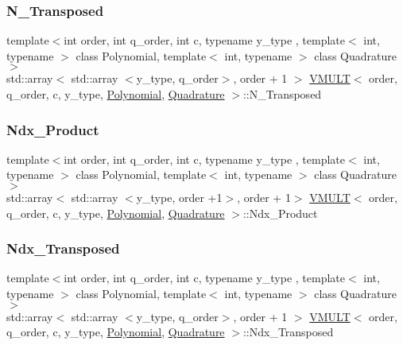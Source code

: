 \mbox{\label{class_v_m_u_l_t_a6a9fd7d80d98b790caae6cb72bb6db05}} 
\subsubsection{\texorpdfstring{N\+\_\+\+Transposed}{N\_Transposed}}
{\footnotesize\ttfamily template$<$int order, int q\+\_\+order, int c, typename y\+\_\+type , template$<$ int, typename $>$ class Polynomial, template$<$ int, typename $>$ class Quadrature$>$ \\
std\+::array$<$ std\+::array $<$y\+\_\+type, q\+\_\+order$>$, order + 1 $>$ \hyperlink{class_v_m_u_l_t}{V\+M\+U\+LT}$<$ order, q\+\_\+order, c, y\+\_\+type, \hyperlink{class_polynomial}{Polynomial}, \hyperlink{class_quadrature}{Quadrature} $>$\+::N\+\_\+\+Transposed}

\mbox{\label{class_v_m_u_l_t_a9b41e56739c33dfa1a547b8b0b757d42}} 
\subsubsection{\texorpdfstring{Ndx\+\_\+\+Product}{Ndx\_Product}}
{\footnotesize\ttfamily template$<$int order, int q\+\_\+order, int c, typename y\+\_\+type , template$<$ int, typename $>$ class Polynomial, template$<$ int, typename $>$ class Quadrature$>$ \\
std\+::array$<$ std\+::array $<$y\+\_\+type, order +1$>$, order + 1$>$ \hyperlink{class_v_m_u_l_t}{V\+M\+U\+LT}$<$ order, q\+\_\+order, c, y\+\_\+type, \hyperlink{class_polynomial}{Polynomial}, \hyperlink{class_quadrature}{Quadrature} $>$\+::Ndx\+\_\+\+Product}

\mbox{\label{class_v_m_u_l_t_a317e137345aaeb4967db30ca7e479435}} 
\subsubsection{\texorpdfstring{Ndx\+\_\+\+Transposed}{Ndx\_Transposed}}
{\footnotesize\ttfamily template$<$int order, int q\+\_\+order, int c, typename y\+\_\+type , template$<$ int, typename $>$ class Polynomial, template$<$ int, typename $>$ class Quadrature$>$ \\
std\+::array$<$ std\+::array $<$y\+\_\+type, q\+\_\+order$>$, order + 1 $>$ \hyperlink{class_v_m_u_l_t}{V\+M\+U\+LT}$<$ order, q\+\_\+order, c, y\+\_\+type, \hyperlink{class_polynomial}{Polynomial}, \hyperlink{class_quadrature}{Quadrature} $>$\+::Ndx\+\_\+\+Transposed}

